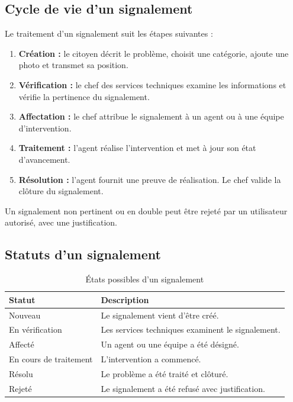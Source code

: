 \documentclass[11pt,a4paper,oneside]{report}
\begin{document}
	\subsection{Cycle de vie d'un signalement}
	
	Le traitement d'un signalement suit les étapes suivantes :
	
	\begin{enumerate}
		\item \textbf{Création :} le citoyen décrit le problème,
		choisit une catégorie, ajoute une photo et transmet sa position.
		
		\item \textbf{Vérification :} le chef des services techniques
		examine les informations et vérifie la pertinence du signalement.
		
		\item \textbf{Affectation :} le chef attribue le signalement
		à un agent ou à une équipe d'intervention.
		
		\item \textbf{Traitement :} l'agent réalise l'intervention
		et met à jour son état d'avancement.
		
		\item \textbf{Résolution :} l'agent fournit une preuve de
		réalisation. Le chef valide la clôture du signalement.
	\end{enumerate}
	
	Un signalement non pertinent ou en double peut être rejeté
	par un utilisateur autorisé, avec une justification.
	
	\subsection{Statuts d'un signalement}
	
	\begin{table}[H]
		\centering
		\small
		\renewcommand{\arraystretch}{1.15}
		\begin{tabular}{|p{4cm}|p{9.4cm}|}
			\hline
			\textbf{Statut} & \textbf{Description} \\
			\hline
			Nouveau & Le signalement vient d'être créé. \\
			\hline
			En vérification & Les services techniques examinent le signalement. \\
			\hline
			Affecté & Un agent ou une équipe a été désigné. \\
			\hline
			En cours de traitement & L'intervention a commencé. \\
			\hline
			Résolu & Le problème a été traité et clôturé. \\
			\hline
			Rejeté & Le signalement a été refusé avec justification. \\
			\hline
		\end{tabular}
		\caption{États possibles d'un signalement}
	\end{table}
	
\end{document}
